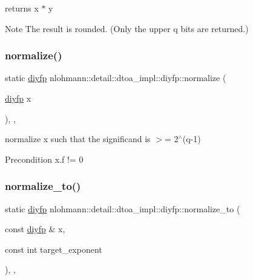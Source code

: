 returns x $\ast$ y 

\begin{DoxyNote}{Note}
The result is rounded. (Only the upper q bits are returned.) 
\end{DoxyNote}
\mbox{\label{structnlohmann_1_1detail_1_1dtoa__impl_1_1diyfp_a2246b5b40c7c6992153ef174063d6aa6}} 
\subsubsection{\texorpdfstring{normalize()}{normalize()}}
{\footnotesize\ttfamily static \hyperlink{structnlohmann_1_1detail_1_1dtoa__impl_1_1diyfp}{diyfp} nlohmann\+::detail\+::dtoa\+\_\+impl\+::diyfp\+::normalize (\begin{DoxyParamCaption}\item[{\hyperlink{structnlohmann_1_1detail_1_1dtoa__impl_1_1diyfp}{diyfp}}]{x }\end{DoxyParamCaption})\hspace{0.3cm}{\ttfamily [inline]}, {\ttfamily [static]}, {\ttfamily [noexcept]}}



normalize x such that the significand is $>$= 2$^\wedge$(q-\/1) 

\begin{DoxyPrecond}{Precondition}
x.\+f != 0 
\end{DoxyPrecond}
\mbox{\label{structnlohmann_1_1detail_1_1dtoa__impl_1_1diyfp_a6b6665e467ebabe0c0f7418d3fe4b118}} 
\subsubsection{\texorpdfstring{normalize\+\_\+to()}{normalize\_to()}}
{\footnotesize\ttfamily static \hyperlink{structnlohmann_1_1detail_1_1dtoa__impl_1_1diyfp}{diyfp} nlohmann\+::detail\+::dtoa\+\_\+impl\+::diyfp\+::normalize\+\_\+to (\begin{DoxyParamCaption}\item[{const \hyperlink{structnlohmann_1_1detail_1_1dtoa__impl_1_1diyfp}{diyfp} \&}]{x,  }\item[{const int}]{target\+\_\+exponent }\end{DoxyParamCaption})\hspace{0.3cm}{\ttfamily [inline]}, {\ttfamily [static]}, {\ttfamily [noexcept]}}



